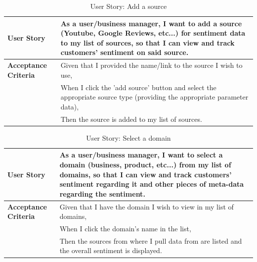 \documentclass[12pt]{article}
\begin{document}
\begin{table}[htbp]
  \caption{User Story: Add a source}
  \begin{tabular}{|p{}|p{}|}
    \hline
    \textbf{User Story}          & As a user/business manager, I want to add a source (Youtube, Google Reviews, etc...) for sentiment data to my list of sources, so that I can view and track customers' sentiment on said source. \\
    \hline
    \textbf{Acceptance Criteria} &
    Given that I provided the name/link to the source I wish to use,                                                                                                                                                           \\
                                 & When I click the 'add source' button and select the appropriate source type (providing the appropriate parameter data),                                                                                                                                                       \\
                                 & Then the source is added to my list of sources.                                                                                                                                             \\
    \hline
  \end{tabular}
\end{table}

\begin{table}[htbp]
  \caption{User Story: Select a domain}
  \begin{tabular}{|p{}|p{}|}
    \hline
    \textbf{User Story}          & As a user/business manager, I want to select a domain (business, product, etc...) from my list of domains, so that I can view and track customers' sentiment regarding it and other pieces of meta-data regarding the sentiment. \\
    \hline
    \textbf{Acceptance Criteria} &
    Given that I have the domain I wish to view in my list of domains,                                                                                                                                                                                              \\
                                 & When I click the domain's name in the list,                                                                                                                                                                                      \\
                                 & Then the sources from where I pull data from are listed and the overall sentiment is displayed.                                                                                                                                  \\
    \hline
  \end{tabular}
\end{table}
\end{document}
